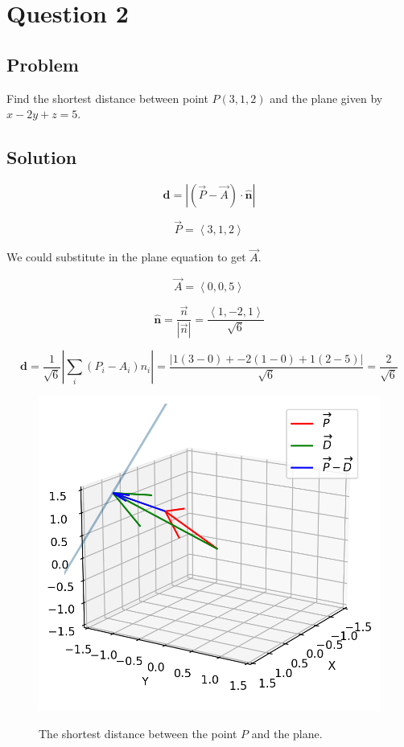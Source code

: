 \documentclass[12pt]{article}
\begin{document}
\section{Question 2}

\subsection{Problem}

Find the shortest distance between point \(P(3, 1, 2)\) and the plane given by
\(x - 2y + z = 5\).

\subsection{Solution}

\[\boldsymbol{d}=|(\vec{P}-\vec{A}) \cdot \widehat{\boldsymbol{n}}|\]

\[
    \vec{P} = \left\langle3, 1, 2\right\rangle
\]

We could substitute in the plane equation to get \(\vec{A}\).

\[
    \vec{A} = \left\langle 0, 0, 5\right\rangle
\]

\[
    \widehat{\boldsymbol{n}} = \frac{\vec{n}}{\left\lvert \vec{n} \right\rvert }
    = \frac{\left\langle 1, -2, 1\right\rangle}{\sqrt{6}}
\]

\[
    \boldsymbol{d} = \frac{1}{\sqrt{6}}\left\lvert \sum_i {(P_i - A_i)n_i}\right\rvert
    = \frac{\left\lvert 1(3 - 0) + -2(1 - 0) + 1(2 - 5)\right\rvert }{\sqrt{6}}
    = \frac{2}{\sqrt{6}}
\]

\begin{figure}[H]
    \includegraphics[width=\linewidth]{Q2.png}\label{fig:Q2}
    \caption{The shortest distance between the point \(P\) and the
        plane.\cite{El-Deeb_PEU-218_Assignments_py}}
\end{figure}
\end{document}
